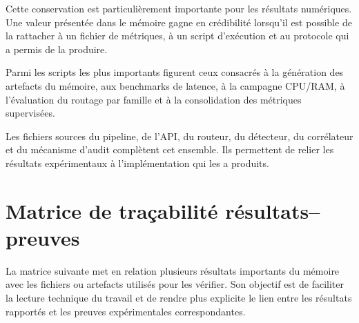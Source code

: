 Cette conservation est particulièrement importante pour les résultats numériques. Une valeur présentée dans le mémoire gagne en crédibilité lorsqu'il est possible de la rattacher à un fichier de métriques, à un script d'exécution et au protocole qui a permis de la produire.

Parmi les scripts les plus importants figurent ceux consacrés à la génération des artefacts du mémoire, aux benchmarks de latence, à la campagne CPU/RAM, à l'évaluation du routage par famille et à la consolidation des métriques supervisées.

Les fichiers sources du pipeline, de l'API, du routeur, du détecteur, du corrélateur et du mécanisme d'audit complètent cet ensemble. Ils permettent de relier les résultats expérimentaux à l'implémentation qui les a produits.


\section{Matrice de traçabilité résultats--preuves}

La matrice suivante met en relation plusieurs résultats importants du mémoire avec les fichiers ou artefacts utilisés pour les vérifier. Son objectif est de faciliter la lecture technique du travail et de rendre plus explicite le lien entre les résultats rapportés et les preuves expérimentales correspondantes.

